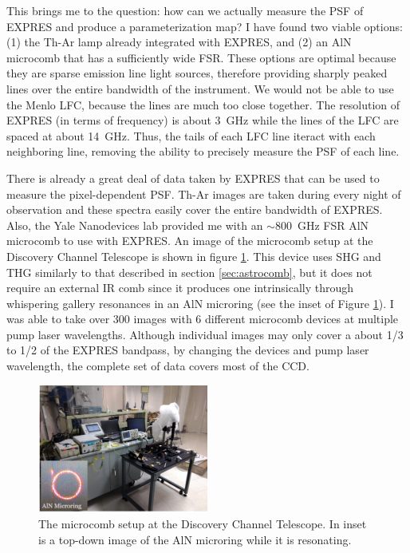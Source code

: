 \documentclass[11pt]{article}
\begin{document}
This brings me to the question: how can we actually measure the PSF of EXPRES and produce a parameterization map? I have found two viable options: (1) the Th-Ar lamp already integrated with EXPRES, and (2) an AlN microcomb that has a sufficiently wide FSR. These options are optimal because they are sparse emission line light sources, therefore providing sharply peaked lines over the entire bandwidth of the instrument. We would not be able to use the Menlo LFC, because the lines are much too close together. The resolution of EXPRES (in terms of frequency) is about \SI{3}{\giga\hertz} while the lines of the LFC are spaced at about \SI{14}{\giga\hertz}. Thus, the tails of each LFC line iteract with each neighboring line, removing the ability to precisely measure the PSF of each line.

There is already a great deal of data taken by EXPRES that can be used to measure the pixel-dependent PSF. Th-Ar images are taken during every night of observation and these spectra easily cover the entire bandwidth of EXPRES. Also, the Yale Nanodevices lab provided me with an $\sim$\SI{800}{\giga\hertz} FSR AlN microcomb to use with EXPRES. An image of the microcomb setup at the Discovery Channel Telescope is shown in figure \ref{fig:aln_setup}. This device uses SHG and THG similarly to that described in section \ref{sec:astrocomb}, but it does not require an external IR comb since it produces one intrinsically through whispering gallery resonances in an AlN microring (see the inset of Figure \ref{fig:aln_setup}). I was able to take over 300 images with 6 different microcomb devices at multiple pump laser wavelengths. Although individual images may only cover a about 1/3 to 1/2 of the EXPRES bandpass, by changing the devices and pump laser wavelength, the complete set of data covers most of the CCD.

\begin{figure}
    \centering
    \includegraphics[width=0.5\textwidth]{images/aln_setup.png}
    \caption{The microcomb setup at the Discovery Channel Telescope. In inset is a top-down image of the AlN microring while it is resonating.}
    \label{fig:aln_setup}
\end{figure}
\end{document}
